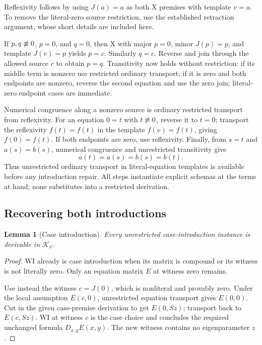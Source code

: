 \documentclass[11pt]{article}
\newtheorem{lemma}[theorem]{Lemma}
\theoremstyle{definition}\newtheorem{definition}[theorem]{Definition}
\newcommand{\lit}{\mathrel{\equiv}}
\newcommand{\Knorm}{\mathcal K_\nu}
\begin{document}
Reflexivity follows by using \(J(a)=a\) as both X premises with template \(v=a\). To remove the literal-zero source restriction, use the established retraction argument, whose short details are included here.

If \(p,q\not\lit0\), \(p=0\), and \(q=0\), then X with major \(p=0\), minor \(J(p)=p\), and template \(J(v)=p\) yields \(p=c\). Similarly \(q=c\). Reverse and join through the allowed source \(c\) to obtain \(p=q\). Transitivity now holds without restriction: if its middle term is nonzero use restricted ordinary transport; if it is zero and both endpoints are nonzero, reverse the second equation and use the zero join; literal-zero endpoint cases are immediate.

Numerical congruence along a nonzero source is ordinary restricted transport from reflexivity. For an equation \(0=t\) with \(t\not\lit0\), reverse it to \(t=0\); transport the reflexivity \(f(t)=f(t)\) in the template \(f(v)=f(t)\), giving \(f(0)=f(t)\). If both endpoints are zero, use reflexivity. Finally, from \(s=t\) and \(a(s)=b(s)\), numerical congruence and unrestricted transitivity give
\[
a(t)=a(s)=b(s)=b(t).
\]
Thus unrestricted ordinary transport in literal-equation templates is available before any introduction repair. All steps instantiate explicit schemas at the terms at hand; none substitutes into a restricted derivation.

\subsection{Recovering both introductions}

\begin{lemma}[Case introduction]\label{cr:case}
Every unrestricted case-introduction instance is derivable in \(\Knorm\).
\end{lemma}
\begin{proof}
WI already is case introduction when its matrix is compound or its witness is not literally zero. Only an equation matrix \(E\) at witness zero remains.

Use instead the witness \(c=J(0)\), which is nonliteral and provably zero. Under the local assumption \(E(c,0)\), unrestricted equation transport gives \(E(0,0)\). Cut in the given case-premise derivation to get \(E(0,Sz)\); transport back to \(E(c,Sz)\). WI at witness \(c\) is the case choice and concludes the required unchanged formula \(D_{x,y}E(x,y)\). The new witness contains no eigenparameter \(z\).
\end{proof}
\end{document}
